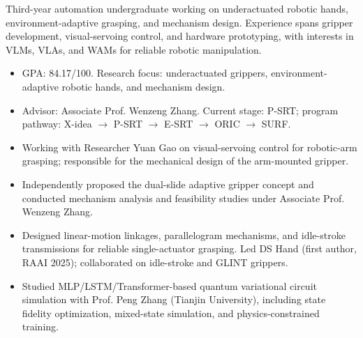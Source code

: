 \documentclass[10pt,a4paper]{article}
\begin{document}

Third-year automation undergraduate working on underactuated robotic hands, environment-adaptive grasping, and mechanism design. Experience spans gripper development, visual-servoing control, and hardware prototyping, with interests in VLMs, VLAs, and WAMs for reliable robotic manipulation.

\begin{itemize}
  \item GPA: 84.17/100. Research focus: underactuated grippers, environment-adaptive robotic hands, and mechanism design.
\end{itemize}
\vspace{3pt}
\begin{itemize}
  \item Advisor: Associate Prof. Wenzeng Zhang. Current stage: P-SRT; program pathway: X-idea $\rightarrow$ P-SRT $\rightarrow$ E-SRT $\rightarrow$ ORIC $\rightarrow$ SURF.
\end{itemize}

\begin{itemize}
  \item Working with Researcher Yuan Gao on visual-servoing control for robotic-arm grasping; responsible for the mechanical design of the arm-mounted gripper.
\end{itemize}
\vspace{3pt}
\begin{itemize}
  \item Independently proposed the dual-slide adaptive gripper concept and conducted mechanism analysis and feasibility studies under Associate Prof. Wenzeng Zhang.
  \item Designed linear-motion linkages, parallelogram mechanisms, and idle-stroke transmissions for reliable single-actuator grasping. Led DS Hand (first author, RAAI 2025); collaborated on idle-stroke and GLINT grippers.
\end{itemize}
\vspace{3pt}
\begin{itemize}
  \item Studied MLP/LSTM/Transformer-based quantum variational circuit simulation with Prof. Peng Zhang (Tianjin University), including state fidelity optimization, mixed-state simulation, and physics-constrained training.
\end{itemize}
\end{document}
